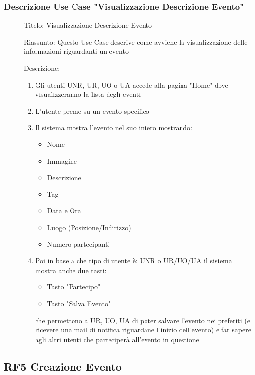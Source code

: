 \documentclass{article}
\begin{document}
\subsubsection*{Descrizione Use Case "Visualizzazione Descrizione Evento"}
\begin{description}
    \item[] Titolo: Visualizzazione Descrizione Evento
    \item[] Riassunto: Questo Use Case descrive come avviene la visualizzazione delle informazioni riguardanti un evento
    \item[] Descrizione:
        \begin{enumerate}
            \item Gli utenti UNR, UR, UO o UA accede alla pagina "Home" dove visualizzeranno la lista degli eventi
            \item L'utente preme su un evento specifico
            \item Il sistema mostra l'evento nel suo intero mostrando:
                  \begin{itemize}
                      \item Nome
                      \item Immagine
                      \item Descrizione
                      \item Tag
                      \item Data e Ora
                      \item Luogo (Posizione/Indirizzo)
                      \item Numero partecipanti
                  \end{itemize}
            \item Poi in base a che tipo di utente è: UNR o UR/UO/UA il sistema mostra anche due tasti:
                  \begin{itemize}
                      \item Tasto "Partecipo"
                      \item Tasto "Salva Evento"
                  \end{itemize}
                  che permettono a UR, UO, UA di poter salvare l'evento nei preferiti (e ricevere una mail di notifica riguardane l'inizio dell'evento) e far sapere agli altri utenti che parteciperà all'evento in questione
        \end{enumerate}
\end{description}
\clearpage
\subsection{RF5 Creazione Evento}
\end{document}
